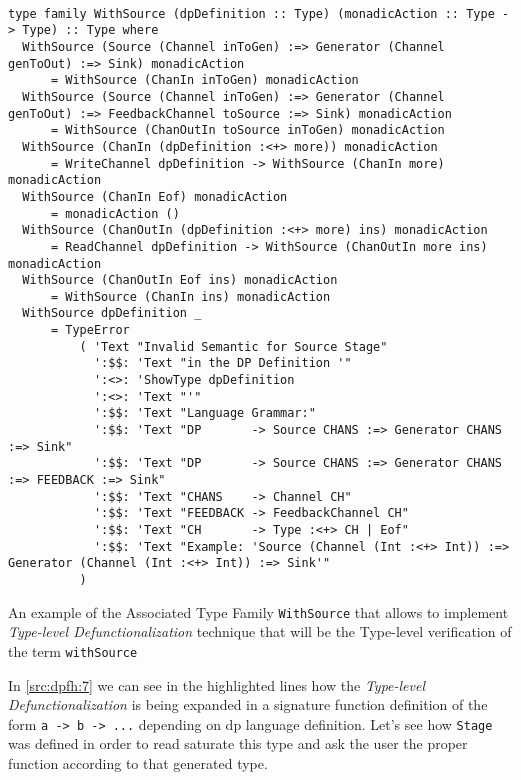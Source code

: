 \begin{listing}[htp!]
  \begin{verbatim}

type family WithSource (dpDefinition :: Type) (monadicAction :: Type -> Type) :: Type where
  WithSource (Source (Channel inToGen) :=> Generator (Channel genToOut) :=> Sink) monadicAction
      = WithSource (ChanIn inToGen) monadicAction
  WithSource (Source (Channel inToGen) :=> Generator (Channel genToOut) :=> FeedbackChannel toSource :=> Sink) monadicAction 
      = WithSource (ChanOutIn toSource inToGen) monadicAction
  WithSource (ChanIn (dpDefinition :<+> more)) monadicAction         
      = WriteChannel dpDefinition -> WithSource (ChanIn more) monadicAction
  WithSource (ChanIn Eof) monadicAction                              
      = monadicAction ()
  WithSource (ChanOutIn (dpDefinition :<+> more) ins) monadicAction  
      = ReadChannel dpDefinition -> WithSource (ChanOutIn more ins) monadicAction
  WithSource (ChanOutIn Eof ins) monadicAction                       
      = WithSource (ChanIn ins) monadicAction
  WithSource dpDefinition _                                          
      = TypeError
          ( 'Text "Invalid Semantic for Source Stage"
            ':$$: 'Text "in the DP Definition '"
            ':<>: 'ShowType dpDefinition
            ':<>: 'Text "'"
            ':$$: 'Text "Language Grammar:"
            ':$$: 'Text "DP       -> Source CHANS :=> Generator CHANS :=> Sink"
            ':$$: 'Text "DP       -> Source CHANS :=> Generator CHANS :=> FEEDBACK :=> Sink"
            ':$$: 'Text "CHANS    -> Channel CH"
            ':$$: 'Text "FEEDBACK -> FeedbackChannel CH"
            ':$$: 'Text "CH       -> Type :<+> CH | Eof"
            ':$$: 'Text "Example: 'Source (Channel (Int :<+> Int)) :=> Generator (Channel (Int :<+> Int)) :=> Sink'"
          )
  \end{verbatim}
  \caption[{[\texttt{Stage.hs}] WithSource Associate Type Details}]{An example of the Associated Type Family \texttt{WithSource} that allows to implement \emph{Type-level Defunctionalization} technique that will be the Type-level verification of the term \texttt{withSource}}
  \label{src:dpfh:7}
\end{listing}

In \autoref{src:dpfh:7} we can see in the highlighted lines how the \emph{Type-level Defunctionalization} is being expanded in a signature function definition of the form \texttt{a -> b -> ...} depending on \acrshort{dp} language definition. 
Let's see how \texttt{Stage} was defined in order to read saturate this type and ask the user the proper function according to that generated type.

